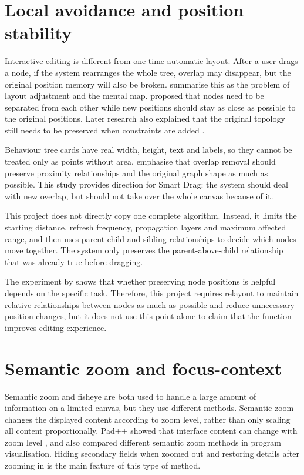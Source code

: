 \section{Local avoidance and position stability}

Interactive editing is different from one-time automatic layout. After a user drags a node, if the system rearranges the whole tree, overlap may disappear, but the original position memory will also be broken. \textcite{misue1995mentalmap} summarise this as the problem of layout adjustment and the mental map. \textcite{dwyer2006fast} proposed that nodes need to be separated from each other while new positions should stay as close as possible to the original positions. Later research also explained that the original topology still needs to be preserved when constraints are added \parencite{dwyer2009topology}.

Behaviour tree cards have real width, height, text and labels, so they cannot be treated only as points without area. \textcite{gansner2010overlap} emphasise that overlap removal should preserve proximity relationships and the original graph shape as much as possible. This study provides direction for Smart Drag: the system should deal with new overlap, but should not take over the whole canvas because of it.

This project does not directly copy one complete algorithm. Instead, it limits the starting distance, refresh frequency, propagation layers and maximum affected range, and then uses parent-child and sibling relationships to decide which nodes move together. The system only preserves the parent-above-child relationship that was already true before dragging.

The experiment by \textcite{archambault2013map} shows that whether preserving node positions is helpful depends on the specific task. Therefore, this project requires relayout to maintain relative relationships between nodes as much as possible and reduce unnecessary position changes, but it does not use this point alone to claim that the function improves editing experience.

\section{Semantic zoom and focus-context}

Semantic zoom and fisheye are both used to handle a large amount of information on a limited canvas, but they use different methods. Semantic zoom changes the displayed content according to zoom level, rather than only scaling all content proportionally. Pad++ showed that interface content can change with zoom level \parencite{bederson1996pad}, and \textcite{summers2003semantic} also compared different semantic zoom methods in program visualisation. Hiding secondary fields when zoomed out and restoring details after zooming in is the main feature of this type of method.

